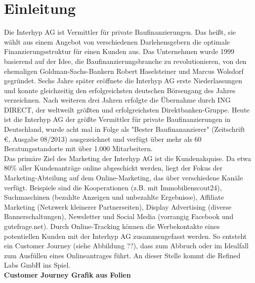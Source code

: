 \section{Einleitung}

Die Interhyp AG ist Vermittler für private Baufinanzierungen. Das heißt, sie wählt aus einem Angebot von verschiedenen Darlehensgebern die optimale Finanzierungsstruktur für einen Kunden aus. Das Unternehmen wurde 1999 basierend auf der Idee, die Baufinanzierungsbranche zu revolutionieren, von den ehemaligen Goldman-Sachs-Bankern Robert Haselsteiner und Marcus Wolsdorf gegründet. Sechs Jahre später eröffnete die Interhyp AG erste Niederlassungen und konnte gleichzeitig den erfolgreichsten deutschen Börsengang des Jahres verzeichnen. Nach weiteren drei Jahren erfolgte die Übernahme durch ING DIRECT, der weltweilt größten und erfolgreichsten Direktbanken-Gruppe. Heute ist die Interhyp AG der größte Vermittler für private Baufinanzierungen in Deutschland, wurde acht mal in Folge als "Bester Baufinananzierer" (Zeitschrift \euro, Ausgabe 08/2013) ausgezeichnet und verfügt über mehr als 60 Beratungsstandorte mit über 1.000 Mitarbeitern.\\
Das primäre Ziel des Marketing der Interhyp AG ist die Kundenakquise. Da etwa 80\% aller Kundenanträge online abgeschickt werden, liegt der Fokus der Marketing-Abteilung auf dem Online-Marketing, das über verschiedene Kanäle verfügt. Beispiele sind die Kooperationen (z.B. mit Immobilienscout24), Suchmaschinen (bezahlte Anzeigen und unbezahlte Ergebnisse), Affiliate Marketing (Netzwerk kleinerer Partnerseiten), Display Advertising (diverse Bannerschaltungen), Newsletter und Social Media (vorrangig Facebook und gutefrage.net). Durch Online-Tracking können die Werbekontakte eines potentiellen Kunden mit der Interhyp AG zusammengefasst werden. So entsteht ein Customer Journey (siehe Abbildung ??), dass zum Abbruch oder im Idealfall zum Ausfüllen eines Onlineantrages führt. An dieser Stelle kommt die Refined Labs GmbH ins Spiel.\\
\textbf{Customer Journey Grafik aus Folien}


